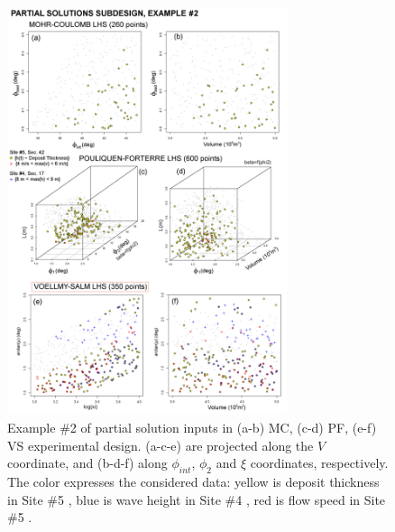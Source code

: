 \documentclass[nhess, manuscript]{copernicus}
\begin{document}
\begin{figure}[H]
\centering
\includegraphics[width=0.73\textwidth]{Fig11.png}
\caption{Example \#2 of partial solution inputs in (a-b) MC, (c-d) PF, (e-f) VS experimental design. (a-c-e) are projected along the $V$ coordinate, and (b-d-f) along $\phi_{int}$, $\phi_2$ and $\xi$ coordinates, respectively. The color expresses the considered data: yellow is deposit thickness in Site \#5 \citep{Saucedo2008}, blue is wave height in Site \#4 \citep{PonceSegura1983}, red is flow speed in Site \#5 \citep{Pierson1985}.}
\label{Fig11}
\end{figure}
\end{document}
